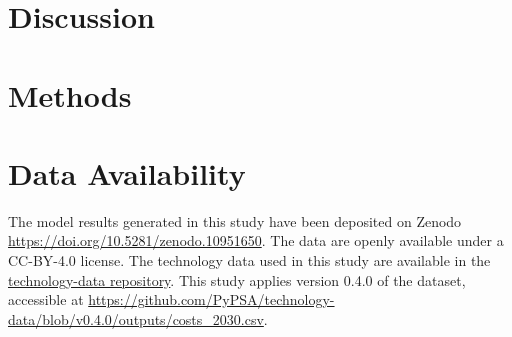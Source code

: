 \documentclass[5p,numafflabel]{elsarticle}
\begin{document}


\section*{Discussion}
\label{sec:discussion}



\label{sec:conclusion}



\section*{Methods}
\label{sec:methods}












\section*{Data Availability}
The model results generated in this study have been deposited on Zenodo \href{https://doi.org/10.5281/zenodo.10951650}{https://doi.org/10.5281/zenodo.10951650}\cite{Schumm2024a}. The data are openly available under a CC-BY-4.0 license.
The technology data used in this study are available in the \href{https://github.com/pypsa/technology-data}{technology-data repository}. This study applies version 0.4.0 of the dataset, accessible at \href{https://github.com/PyPSA/technology-data/blob/v0.4.0/outputs/costs_2030.csv}{https://github.com/PyPSA/technology-data/blob/v0.4.0/outputs/costs\_2030.csv}.
\end{document}
